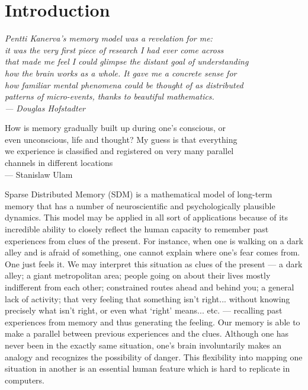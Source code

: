 
\chapter{Introduction}

\bigskip

\begin{flushright}{\slshape
    {Pentti Kanerva's memory model was a revelation for me: \\
    it was the very first piece of research I had ever come across\\
    that made me feel I could glimpse the distant goal of understanding \\
    how the brain works as a whole. It gave me a concrete sense for\\
    how familiar mental phenomena could be thought of as distributed\\
    patterns of micro-events, thanks to beautiful mathematics.} \\ \medskip
    --- Douglas Hofstadter
    \bigskip
    \bigskip

    {How is memory gradually built up during one's conscious, or\\
    even unconscious, life and thought?  My guess is that everything \\
    we experience is classified and registered on very many parallel \\
    channels in different locations} \\ \medskip
    --- Stanislaw Ulam}
\end{flushright}
\bigskip
\bigskip




Sparse Distributed Memory (SDM) \citep{Kanerva1988} is a mathematical model of long-term memory that has a number of neuroscientific and psychologically plausible dynamics. This model may be applied in all sort of applications because of its incredible ability to closely reflect the human capacity to remember past experiences from clues of the present. For instance, when one is walking on a dark alley and is afraid of something, one cannot explain where one's fear comes from. One just feels it. We may interpret this situation as clues of the present --- a dark alley; a giant metropolitan area; people going on about their lives mostly indifferent from each other; constrained routes ahead and behind you; a general lack of activity; that very feeling that something isn't right... without knowing precisely what isn't right, or even what `right' means... etc. --- recalling past experiences from memory and thus generating the feeling. Our memory is able to make a parallel between previous experiences and the clues. Although one has never been in the exactly same situation, one's brain involuntarily makes an analogy and recognizes the possibility of danger. This flexibility into mapping one situation in another is an essential human feature which is hard to replicate in computers.

